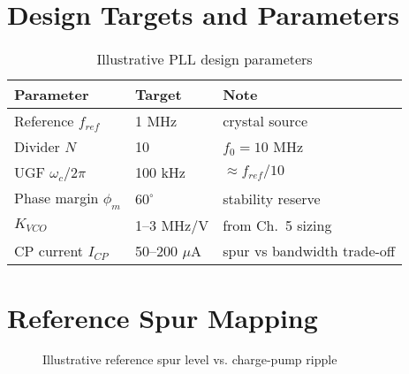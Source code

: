 \section{Design Targets and Parameters}
\begin{table}[H]
  \centering
  \begin{tabular}{lll}
    \toprule
    Parameter & Target & Note \\
    \midrule
    Reference $f_{ref}$ & 1 MHz & crystal source \\
    Divider $N$ & 10 & $f_0=10$ MHz \\
    UGF $\omega_c/2\pi$ & 100 kHz & $\approx f_{ref}/10$ \\
    Phase margin $\phi_m$ & $60^\circ$ & stability reserve \\
    $K_{VCO}$ & 1–3 MHz/V & from Ch.~5 sizing \\
    CP current $I_{CP}$ & 50–200 $\mu$A & spur vs bandwidth trade-off \\
    \bottomrule
  \end{tabular}
  \caption{Illustrative PLL design parameters}
\end{table}

\section{Reference Spur Mapping}
\begin{figure}[H]
  \centering
  \caption{Illustrative reference spur level vs. charge-pump ripple}
\end{figure}


